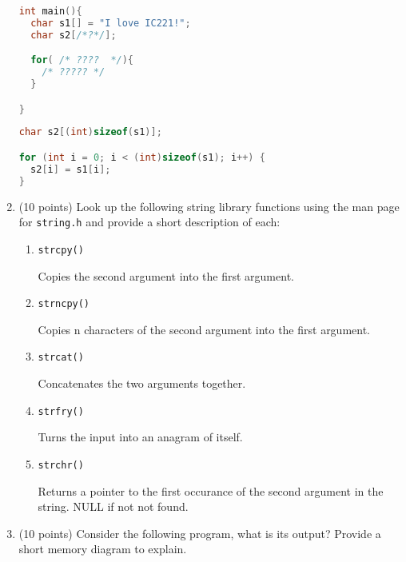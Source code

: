 \documentclass{article}[9pt]
\newenvironment{answerfont}{\fontfamily{qhv}\selectfont}{\par}
\newenvironment{myanswer}{\begin{mdframed}\begin{answerfont}}{\end{answerfont}\end{mdframed}}
\begin{document}
\begin{enumerate}
\begin{lstlisting}[language=c]
int main(){
  char s1[] = "I love IC221!";
  char s2[/*?*/];

  for( /* ????  */){
    /* ????? */
  }

}
\end{lstlisting}

\begin{myanswer}
\begin{lstlisting}[language=c]
char s2[(int)sizeof(s1)];

for (int i = 0; i < (int)sizeof(s1); i++) {
  s2[i] = s1[i];
}
\end{lstlisting}
\end{myanswer}

\item (10 points) Look up the following string library functions using the man
page for \texttt{string.h} and provide a short description of each:

\begin{enumerate}
\item \texttt{strcpy()}
\begin{myanswer}
Copies the second argument into the first argument.
\end{myanswer}

\item \texttt{strncpy()}
\begin{myanswer}
Copies n characters of the second argument into the first argument.
\end{myanswer}

\item \texttt{strcat()}
\begin{myanswer}
Concatenates the two arguments together.
\end{myanswer}

\item \texttt{strfry()}
\begin{myanswer}
Turns the input into an anagram of itself.
\end{myanswer}

\item \texttt{strchr()}
\begin{myanswer}
Returns a pointer to the first occurance of the second argument in the
string.  NULL if not not found.
\end{myanswer}

\end{enumerate}

\item (10 points) Consider the following program, what is its output? Provide a
short memory diagram to explain.


\end{enumerate}
\end{document}
